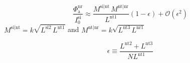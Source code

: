 \documentclass[twocolumn]{article}
\begin{document}
\begin{equation}
\label{eq:fan-in__transformer_collection}
\frac{\Phi_{\mathrm{a}}^{\mathrm{nr}}}{I_0^\mathrm{si}} \approx \frac{ M^{\mathrm{si|nt}} \, M^{\mathrm{nt|nr}} }{L^{\mathrm{nt1}}} \left( 1-\epsilon \right) + \mathcal{O}(\epsilon^2)
\end{equation}
$M^{\mathrm{si|nt}} = k\sqrt{L^{\mathrm{si2}} \, L^{\mathrm{nt1}}}$ and $M^{\mathrm{nt|nr}} = k\sqrt{L^{\mathrm{nt3}} \, L^{\mathrm{nr1}}}$

\begin{equation}
\label{eq:fan-in__transformer_collection__epsilon}
\epsilon \equiv \frac{ L^{\mathrm{nt2}}+L^{\mathrm{nt3}} }{ N L^{\mathrm{nt1}} }
\end{equation}




\end{document}

